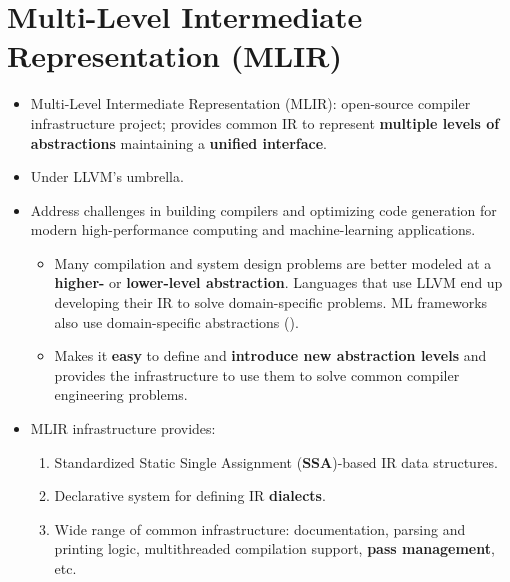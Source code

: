 \documentclass[8pt,a4paper,oneside,hidelinks,aspectratio=169,dvipsnames]{beamer}
\begin{document}
\section{Multi-Level Intermediate Representation (MLIR)}

\begin{frame}{}
  \begin{itemize}
    \item Multi-Level Intermediate Representation (MLIR): open-source compiler infrastructure project; provides common IR to represent \textbf{multiple levels of abstractions} maintaining a \textbf{unified interface}.
    \item Under LLVM's umbrella.
    \item Address challenges in building compilers and optimizing code generation for modern high-performance computing and machine-learning applications.
          \begin{itemize}
            \item Many compilation and system design problems are better modeled at a \textbf{higher-} or \textbf{lower-level abstraction}. Languages that use LLVM end up developing their IR to solve domain-specific problems. ML frameworks also use domain-specific abstractions ().
            \item Makes it \textbf{easy} to define and \textbf{introduce new abstraction levels} and provides the infrastructure to use them to solve common compiler engineering problems.
          \end{itemize}
    \item MLIR infrastructure provides:
          \begin{enumerate}
            \item Standardized Static Single Assignment (\textbf{SSA})-based IR data structures.
            \item Declarative system for defining IR \textbf{dialects}.
            \item Wide range of common infrastructure: documentation, parsing and printing logic, multithreaded compilation support, \textbf{pass management}, etc.
          \end{enumerate}
  \end{itemize}
\end{frame}
\end{document}
